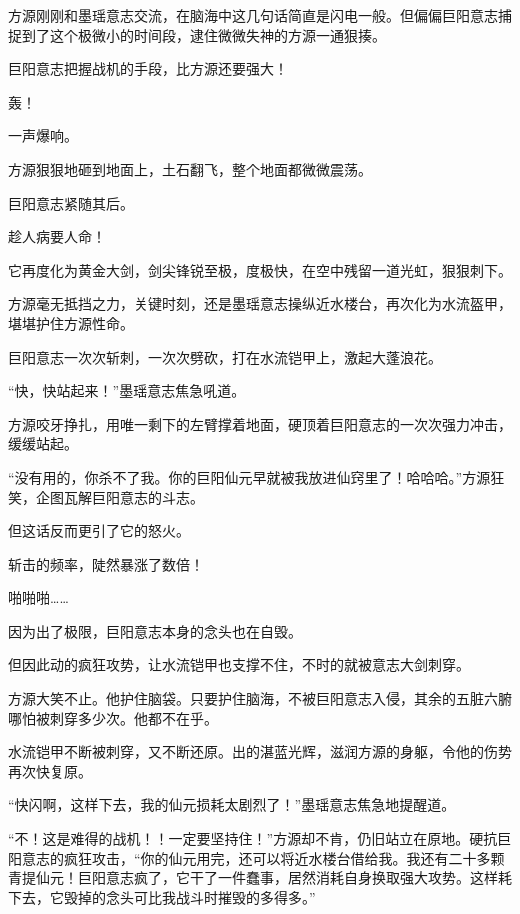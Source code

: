 
\begin{this_body}

方源刚刚和墨瑶意志交流，在脑海中这几句话简直是闪电一般。但偏偏巨阳意志捕捉到了这个极微小的时间段，逮住微微失神的方源一通狠揍。

巨阳意志把握战机的手段，比方源还要强大！

轰！

一声爆响。

方源狠狠地砸到地面上，土石翻飞，整个地面都微微震荡。

巨阳意志紧随其后。

趁人病要人命！

它再度化为黄金大剑，剑尖锋锐至极，度极快，在空中残留一道光虹，狠狠刺下。

方源毫无抵挡之力，关键时刻，还是墨瑶意志操纵近水楼台，再次化为水流盔甲，堪堪护住方源性命。

巨阳意志一次次斩刺，一次次劈砍，打在水流铠甲上，激起大蓬浪花。

“快，快站起来！”墨瑶意志焦急吼道。

方源咬牙挣扎，用唯一剩下的左臂撑着地面，硬顶着巨阳意志的一次次强力冲击，缓缓站起。

“没有用的，你杀不了我。你的巨阳仙元早就被我放进仙窍里了！哈哈哈。”方源狂笑，企图瓦解巨阳意志的斗志。

但这话反而更引了它的怒火。

斩击的频率，陡然暴涨了数倍！

啪啪啪……

因为出了极限，巨阳意志本身的念头也在自毁。

但因此动的疯狂攻势，让水流铠甲也支撑不住，不时的就被意志大剑刺穿。

方源大笑不止。他护住脑袋。只要护住脑海，不被巨阳意志入侵，其余的五脏六腑哪怕被刺穿多少次。他都不在乎。

水流铠甲不断被刺穿，又不断还原。出的湛蓝光辉，滋润方源的身躯，令他的伤势再次快复原。

“快闪啊，这样下去，我的仙元损耗太剧烈了！”墨瑶意志焦急地提醒道。

“不！这是难得的战机！！一定要坚持住！”方源却不肯，仍旧站立在原地。硬抗巨阳意志的疯狂攻击，“你的仙元用完，还可以将近水楼台借给我。我还有二十多颗青提仙元！巨阳意志疯了，它干了一件蠢事，居然消耗自身换取强大攻势。这样耗下去，它毁掉的念头可比我战斗时摧毁的多得多。”


\end{this_body}
